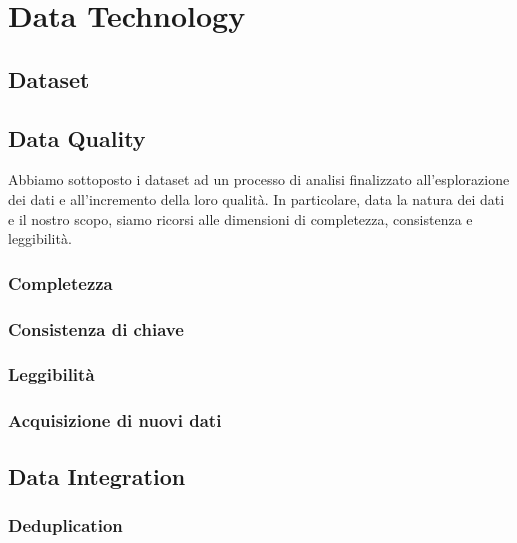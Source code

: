 \setcounter{chapter}{0}

\part{Data Technology}

\chapter{Dataset}

\chapter{Data Quality}
\label{chap:data-quality}
Abbiamo sottoposto i dataset ad un processo di analisi finalizzato 
all'esplorazione dei dati e all'incremento della loro qualità. In particolare, 
data la natura dei dati e il nostro scopo, siamo ricorsi alle dimensioni di 
completezza, consistenza e leggibilità.


\section{Completezza}

\section{Consistenza di chiave}

\section{Leggibilità}

\section{Acquisizione di nuovi dati}

\chapter{Data Integration}
\label{chap:data-integration}

\section{Deduplication}

